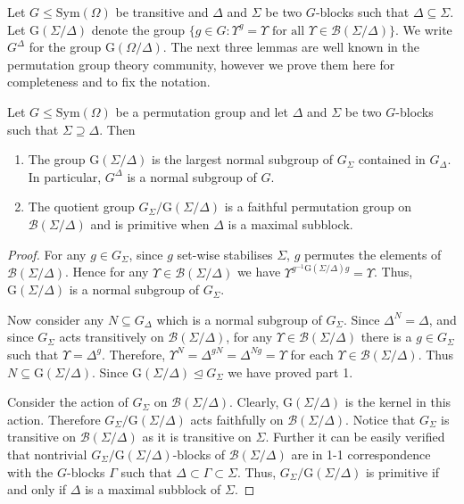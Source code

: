 \documentclass[prodmod,acmtalg]{acmsmall}
\newcommand{\Blocks}[1]{{\ensuremath{\mathcal{B}\left(#1\right)}}}
\newcommand{\Gof}[1]{{\ensuremath{\mathrm{G}\left(\scriptstyle #1\right)}}}
\newcommand{\Sym}[1]{{\ensuremath{\mathrm{Sym}\left(#1\right)}}}
\begin{document}
Let $G\leq\Sym{\Omega}$ be transitive and $\Delta$ and $\Sigma$ be two
$G$-blocks such that $\Delta\subseteq \Sigma$. Let
$\Gof{\Sigma/\Delta}$ denote the group $\{ g \in G : \Upsilon^g =
\Upsilon \textrm{ for all } \Upsilon \in \Blocks{\Sigma/\Delta} \}$.
We write $G^\Delta$ for the group $\Gof{\Omega/\Delta}$.  The next
three lemmas are well known in the permutation group theory community,
however we prove them here for completeness and to fix the notation.

\begin{lemma}\label{lem-gofsigma}
  Let $G\leq\Sym{\Omega}$ be a permutation group and let $\Delta$ and
  $\Sigma$ be two $G$-blocks such that $\Sigma \supseteq \Delta$. Then
  \begin{enumerate}
  \item The group $\Gof{\Sigma/\Delta}$ is the largest normal subgroup
    of $G_\Sigma$ contained in $G_\Delta$. In particular, $G^\Delta$
    is a normal subgroup of $G$.

  \item The quotient group ${G_\Sigma}/{\Gof{\Sigma/\Delta}}$ is a
    faithful permutation group on $\Blocks{\Sigma/\Delta}$ and is
    primitive when $\Delta$ is a maximal subblock.
  \end{enumerate}
\end{lemma}

\begin{proof}
  For any $g \in G_\Sigma$, since $g$ set-wise stabilises $\Sigma$,
  $g$ permutes the elements of $\Blocks{\Sigma/\Delta}$. Hence for any
  $\Upsilon \in \Blocks{\Sigma/\Delta}$ we have
  $\Upsilon^{g^{-1}\Gof{\Sigma/\Delta}g} = \Upsilon$. Thus,
  $\Gof{\Sigma/\Delta}$ is a normal subgroup of $G_\Sigma$.

  Now consider any $N\subseteq G_\Delta$ which is a normal subgroup of
  $G_\Sigma$. Since $\Delta^N = \Delta$, and since $G_\Sigma$ acts
  transitively on $\Blocks{\Sigma/\Delta}$, for any $\Upsilon \in
  \Blocks{\Sigma/\Delta}$ there is a $g \in G_\Sigma$ such that
  $\Upsilon = \Delta^g$. Therefore, $\Upsilon^N = \Delta^{gN} =
  \Delta^{Ng}= \Upsilon$ for each $\Upsilon \in
  \Blocks{\Sigma/\Delta}$. Thus $N\subseteq \Gof{\Sigma/\Delta}$.
  Since $\Gof{\Sigma/\Delta}\unlhd G_\Sigma$ we have proved part 1.

  Consider the action of $G_\Sigma$ on
  $\Blocks{\Sigma/\Delta}$. Clearly, $\Gof{\Sigma/\Delta}$ is the
  kernel in this action. Therefore $G_\Sigma/\Gof{\Sigma/\Delta}$ acts
  faithfully on $\Blocks{\Sigma/\Delta}$. Notice that $G_\Sigma$ is
  transitive on $\Blocks{\Sigma/\Delta}$ as it is transitive on
  $\Sigma$. Further it can be easily verified that nontrivial
  $G_\Sigma/\Gof{\Sigma/\Delta}$-blocks of $\Blocks{\Sigma/\Delta}$
  are in 1-1 correspondence with the $G$-blocks $\Gamma$ such that
  $\Delta\subset \Gamma \subset\Sigma$. Thus,
  $G_\Sigma/\Gof{\Sigma/\Delta}$ is primitive if and only if $\Delta$
  is a maximal subblock of $\Sigma$.

\end{proof}
\end{document}
